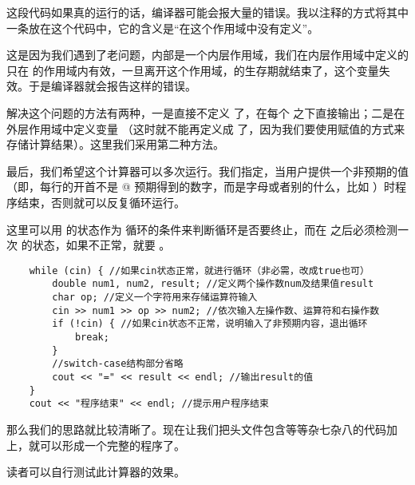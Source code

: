这段代码如果真的运行的话，编译器可能会报大量的错误。我以注释的方式将其中一条放在这个代码中，它的含义是``\lstinline@result@ 在这个作用域中没有定义''。\par
这是因为我们遇到了老问题，\lstinline@switch@ 内部是一个内层作用域，我们在内层作用域中定义的 \lstinline@result@ 只在 \lstinline@switch@ 的作用域内有效，一旦离开这个作用域，\lstinline@result@ 的生存期就结束了，这个变量失效。于是编译器就会报告这样的错误。\par
解决这个问题的方法有两种，一是直接不定义 \lstinline@result@ 了，在每个 \lstinline@case@ 之下直接输出；二是在外层作用域中定义变量 \lstinline@result@（这时就不能再定义成 \lstinline@const@ 了，因为我们要使用赋值的方式来存储计算结果）。这里我们采用第二种方法。\par
最后，我们希望这个计算器可以多次运行。我们指定，当用户提供一个非预期的值（即，每行的开首不是 @ 预期得到的数字，而是字母或者别的什么，比如 \lstinline@q@ 
）时程序结束，否则就可以反复循环运行。\par
这里可以用 \lstinline@cin@ 的状态作为 \lstinline@while@ 循环的条件来判断循环是否要终止，而在 \lstinline@cin@ 之后必须检测一次 \lstinline@cin@ 的状态，如果不正常，就要 \lstinline@break@。
\begin{lstlisting}
    while (cin) { //如果cin状态正常，就进行循环（非必需，改成true也可）
        double num1, num2, result; //定义两个操作数num及结果值result
        char op; //定义一个字符用来存储运算符输入
        cin >> num1 >> op >> num2; //依次输入左操作数、运算符和右操作数
        if (!cin) { //如果cin状态不正常，说明输入了非预期内容，退出循环
            break;
        }
        //switch-case结构部分省略
        cout << "=" << result << endl; //输出result的值
    }
    cout << "程序结束" << endl; //提示用户程序结束
\end{lstlisting}\par
那么我们的思路就比较清晰了。现在让我们把头文件包含等等杂七杂八的代码加上，就可以形成一个完整的程序了。\par
\par
读者可以自行测试此计算器的效果。\par
